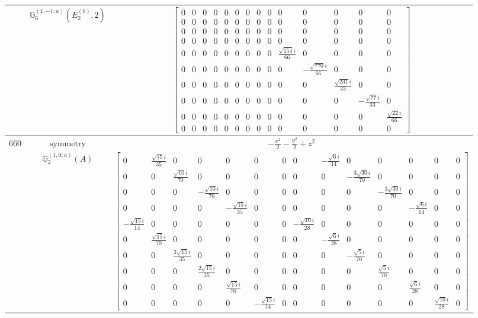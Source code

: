 \documentclass[fleqn,8pt,landscape]{jsarticle}
\begin{document}
\begin{longtable}{ccc}
$  $ & $ \mathbb{G}_{6}^{(1,-1;a)}(E_{2}^{(b)},2) $ & $ \begin{bmatrix} 0 & 0 & 0 & 0 & 0 & 0 & 0 & 0 & 0 & 0 & 0 & 0 & 0 & 0 \\ 0 & 0 & 0 & 0 & 0 & 0 & 0 & 0 & 0 & 0 & 0 & 0 & 0 & 0 \\ 0 & 0 & 0 & 0 & 0 & 0 & 0 & 0 & 0 & 0 & 0 & 0 & 0 & 0 \\ 0 & 0 & 0 & 0 & 0 & 0 & 0 & 0 & 0 & 0 & 0 & 0 & 0 & 0 \\ 0 & 0 & 0 & 0 & 0 & 0 & 0 & 0 & 0 & \frac{\sqrt{154} i}{66} & 0 & 0 & 0 & 0 \\ 0 & 0 & 0 & 0 & 0 & 0 & 0 & 0 & 0 & 0 & - \frac{\sqrt{770} i}{66} & 0 & 0 & 0 \\ 0 & 0 & 0 & 0 & 0 & 0 & 0 & 0 & 0 & 0 & 0 & \frac{\sqrt{231} i}{33} & 0 & 0 \\ 0 & 0 & 0 & 0 & 0 & 0 & 0 & 0 & 0 & 0 & 0 & 0 & - \frac{\sqrt{77} i}{33} & 0 \\ 0 & 0 & 0 & 0 & 0 & 0 & 0 & 0 & 0 & 0 & 0 & 0 & 0 & \frac{\sqrt{22} i}{66} \\ 0 & 0 & 0 & 0 & 0 & 0 & 0 & 0 & 0 & 0 & 0 & 0 & 0 & 0 \end{bmatrix} $ \\ \hline
$ 660 $ & $ \text{symmetry} $ & $ - \frac{x^{2}}{2} - \frac{y^{2}}{2} + z^{2} $ \\
$  $ & $ \mathbb{G}_{2}^{(1,0;a)}(A) $ & $ \begin{bmatrix} 0 & \frac{\sqrt{15} i}{35} & 0 & 0 & 0 & 0 & 0 & 0 & - \frac{\sqrt{6} i}{14} & 0 & 0 & 0 & 0 & 0 \\ 0 & 0 & \frac{\sqrt{10} i}{70} & 0 & 0 & 0 & 0 & 0 & 0 & - \frac{3 \sqrt{30} i}{70} & 0 & 0 & 0 & 0 \\ 0 & 0 & 0 & - \frac{\sqrt{10} i}{70} & 0 & 0 & 0 & 0 & 0 & 0 & - \frac{3 \sqrt{30} i}{70} & 0 & 0 & 0 \\ 0 & 0 & 0 & 0 & - \frac{\sqrt{15} i}{35} & 0 & 0 & 0 & 0 & 0 & 0 & - \frac{\sqrt{6} i}{14} & 0 & 0 \\ - \frac{\sqrt{15} i}{14} & 0 & 0 & 0 & 0 & 0 & 0 & - \frac{\sqrt{10} i}{28} & 0 & 0 & 0 & 0 & 0 & 0 \\ 0 & \frac{\sqrt{15} i}{70} & 0 & 0 & 0 & 0 & 0 & 0 & - \frac{\sqrt{6} i}{28} & 0 & 0 & 0 & 0 & 0 \\ 0 & 0 & \frac{2 \sqrt{15} i}{35} & 0 & 0 & 0 & 0 & 0 & 0 & - \frac{\sqrt{5} i}{70} & 0 & 0 & 0 & 0 \\ 0 & 0 & 0 & \frac{2 \sqrt{15} i}{35} & 0 & 0 & 0 & 0 & 0 & 0 & \frac{\sqrt{5} i}{70} & 0 & 0 & 0 \\ 0 & 0 & 0 & 0 & \frac{\sqrt{15} i}{70} & 0 & 0 & 0 & 0 & 0 & 0 & \frac{\sqrt{6} i}{28} & 0 & 0 \\ 0 & 0 & 0 & 0 & 0 & - \frac{\sqrt{15} i}{14} & 0 & 0 & 0 & 0 & 0 & 0 & \frac{\sqrt{10} i}{28} & 0 \end{bmatrix} $ \\ \hline

\end{longtable}
\end{document}
